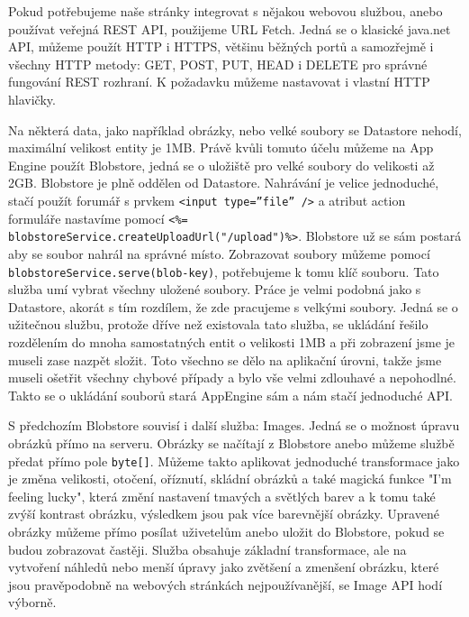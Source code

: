 Pokud potřebujeme naše stránky integrovat s nějakou webovou službou, anebo používat veřejná REST API, použijeme URL Fetch. Jedná se o klasické java.net API, můžeme použít HTTP i HTTPS, většinu běžných portů a samozřejmě i všechny HTTP metody: GET, POST, PUT, HEAD i DELETE pro správné fungování REST rozhraní. K požadavku můžeme nastavovat i vlastní HTTP hlavičky.

Na některá data, jako například obrázky, nebo velké soubory se Datastore nehodí, maximální velikost entity je 1MB. Právě kvůli tomuto účelu můžeme na App Engine použít Blobstore, jedná se o uložiště pro velké soubory do velikosti až 2GB. Blobstore je plně oddělen od Datastore. Nahrávání je velice jednoduché, stačí použít forumář s prvkem \verb|<input type=”file” />| a atribut action formuláře nastavíme pomocí \verb|<%= blobstoreService.createUploadUrl("/upload")%>|.
Blobstore už se sám postará aby se soubor nahrál na správné místo. Zobrazovat soubory můžeme pomocí \verb|blobstoreService.serve(blob-key)|, potřebujeme k tomu klíč souboru. Tato služba umí vybrat všechny uložené soubory. Práce je velmi podobná jako s Datastore, akorát s tím rozdílem, že zde pracujeme s velkými soubory. Jedná se o užitečnou službu, protože dříve než existovala tato služba, se ukládání řešilo rozdělením do mnoha samostatných entit o velikosti 1MB a při zobrazení jsme je museli zase nazpět složit. Toto všechno se dělo na aplikační úrovni, takže jsme museli ošetřit všechny chybové případy a bylo vše velmi zdlouhavé a nepohodlné. Takto se o ukládání souborů stará AppEngine sám a nám stačí jednoduché API.

S předchozím Blobstore souvisí i další služba: Images. Jedná se o možnost úpravu obrázků přímo na serveru. Obrázky se načítají z Blobstore anebo můžeme službě předat přímo pole \verb|byte[]|. Můžeme takto aplikovat jednoduché transformace jako je změna velikosti, otočení, oříznutí, skládní obrázků a také magická funkce "I’m feeling lucky", která změní nastavení tmavých a světlých barev a k tomu také zvýší kontrast obrázku, výsledkem jsou pak více barevnější obrázky. Upravené obrázky můžeme přímo posílat uživetelům anebo uložit do Blobstore, pokud se budou zobrazovat častěji. Služba obsahuje základní transformace, ale na vytvoření náhledů nebo menší úpravy jako zvětšení a zmenšení obrázku, které jsou pravěpodobně na webových stránkách nejpoužívanější, se Image API hodí výborně.

